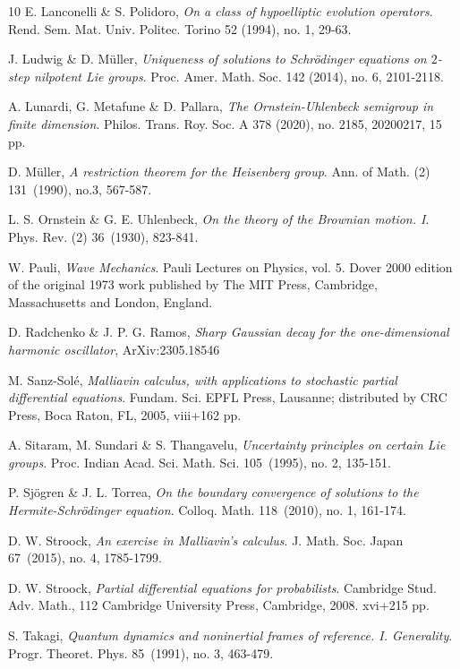 \documentclass[11pt,a4paper]{amsart}
\numberwithin{equation}{section}
\numberwithin{equation}{section}
\begin{document}
\begin{thebibliography}{10}
E. Lanconelli \& S. Polidoro, \emph{On a class of hypoelliptic evolution operators}.
Rend. Sem. Mat. Univ. Politec. Torino 52 (1994), no. 1, 29-63.

J. Ludwig \& D. M\"uller, \emph{Uniqueness of solutions to Schr\"odinger equations on $2$-step nilpotent Lie groups}.
Proc. Amer. Math. Soc. 142 (2014), no. 6, 2101-2118.

A. Lunardi, G. Metafune \& D. Pallara, \emph{The Ornstein-Uhlenbeck semigroup in finite dimension}.
Philos. Trans. Roy. Soc. A 378 (2020), no. 2185, 20200217, 15 pp.

D. M\"uller, 
\emph{A restriction theorem for the Heisenberg group}.
Ann. of Math. (2) 131~(1990), no.3, 567-587.

L. S. Ornstein \& G. E. Uhlenbeck, \emph{On the theory of the Brownian motion. I}.
Phys. Rev. (2) 36~(1930), 823-841. 

W. Pauli, \emph{Wave Mechanics}. Pauli Lectures on Physics, vol. 5. Dover 2000 edition of the original 1973 work published by The MIT Press, Cambridge, Massachusetts and London, England.  

D. Radchenko \& J. P. G. Ramos, \emph{Sharp Gaussian decay for the one-dimensional harmonic oscillator}, ArXiv:2305.18546

M. Sanz-Sol\'e, \emph{Malliavin calculus, with applications to stochastic partial differential equations}.
Fundam. Sci.
EPFL Press, Lausanne; distributed by CRC Press, Boca Raton, FL, 2005, viii+162 pp.

A. Sitaram, M. Sundari \& S. Thangavelu, \emph{Uncertainty principles on certain Lie groups}.
Proc. Indian Acad. Sci. Math. Sci. 105~(1995), no. 2, 135-151.

P. Sj\"ogren \& J. L. Torrea, \emph{On the boundary convergence of solutions to the Hermite-Schr\"odinger equation}.
Colloq. Math. 118~(2010), no. 1, 161-174.

D. W. Stroock, \emph{An exercise in Malliavin's calculus}.
J. Math. Soc. Japan 67~(2015), no. 4, 1785-1799.

D. W. Stroock, \emph{Partial differential equations for probabilists}.
Cambridge Stud. Adv. Math., 112
Cambridge University Press, Cambridge, 2008. xvi+215 pp.



S. Takagi, \emph{Quantum dynamics and noninertial frames of reference. I. Generality}.
Progr. Theoret. Phys. 85~(1991), no. 3, 463-479.


\end{thebibliography}
\end{document}
